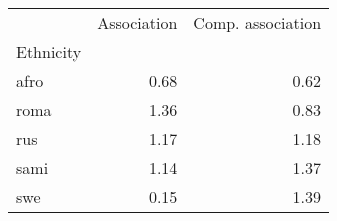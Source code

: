 \begin{tabular}{lrr}
\toprule
{} &  Association &  Comp. association \\
Ethnicity &              &                    \\
\midrule
afro      &         0.68 &               0.62 \\
roma      &         1.36 &               0.83 \\
rus       &         1.17 &               1.18 \\
sami      &         1.14 &               1.37 \\
swe       &         0.15 &               1.39 \\
\bottomrule
\end{tabular}
